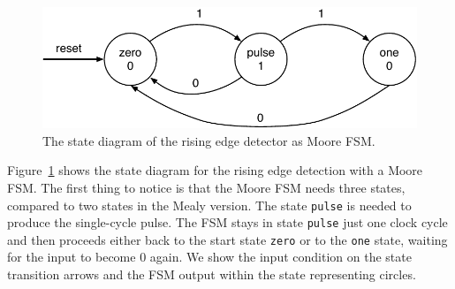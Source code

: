 \documentclass[%
    10pt,
    headinclude, footexclude,
    openright, %
    notitlepage,
    cleardoubleempty,
    headsepline,
    pointlessnumbers,
    bibtotoc, idxtotoc,
    ]{scrbook}
\newcommand{\scale}{0.7}
\newcommand{\code}[1]{{\lstinline[basicstyle=\small\ttfamily]{#1}}}
\begin{document}
\begin{figure}
  \centering
  \includegraphics[scale=\scale]{figures/state-diag-rising-moore}
  \caption{The state diagram of the rising edge detector as Moore FSM.}
  \label{fig:diag:rising:moore}
\end{figure}

%

Figure~\ref{fig:diag:rising:moore} shows the state diagram for the rising
edge detection with a Moore FSM. The first thing to notice is that the Moore FSM
needs three states, compared to two states in the Mealy version.
The state \code{pulse} is needed to produce the single-cycle pulse.
The FSM stays in state \code{pulse} just one clock cycle and then
proceeds either back to the start state \code{zero} or to the \code{one}
state, waiting for the input to become 0 again.
We show the input condition on the state transition arrows and the
FSM output within the state representing circles.

\end{document}

